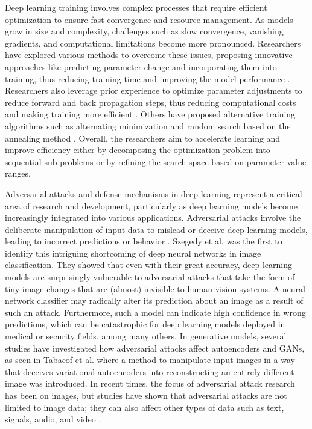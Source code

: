 \documentclass[preprint,12pt]{elsarticle}
\begin{document}
Deep learning training involves complex processes that require efficient optimization to ensure fast convergence and resource management. As models grow in size and complexity, challenges such as slow convergence, vanishing gradients, and computational limitations become more pronounced. Researchers have explored various methods to overcome these issues, proposing innovative approaches like predicting parameter change and incorporating them into training, thus reducing training time and improving the model performance \citep{ying_enhancing_2024}. Researchers also leverage prior experience to optimize parameter adjustments to reduce forward and back propagation steps, thus reducing computational costs and making training more efficient \citep{wang_optimizing_2024}. Others have proposed alternative training algorithms such as alternating minimization \citep{yan_triple-inertial_2025} and random search based on the annealing method \citep{krasnoproshin_random_2024}. Overall, the researchers aim to accelerate learning and improve efficiency either by decomposing the optimization problem into sequential sub-problems or by refining the search space based on parameter value ranges.

Adversarial attacks and defense mechanisms in deep learning represent a critical area of research and development, particularly as deep learning models become increasingly integrated into various applications. Adversarial attacks involve the deliberate manipulation of input data to mislead or deceive deep learning models, leading to incorrect predictions or behavior \citep{adversarial2018}. Szegedy et al. \citep{szegedy2013intriguing} was the first to identify this intriguing shortcoming of deep neural networks in image classification. They showed that even with their great accuracy, deep learning models are surprisingly vulnerable to adversarial attacks that take the form of tiny image changes that are (almost) invisible to human vision systems. A neural network classifier may radically alter its prediction about an image as a result of such an attack. Furthermore, such a model can indicate high confidence in wrong predictions, which can be catastrophic for deep learning models deployed in medical or security fields, among many others. In generative models, several studies have investigated how adversarial attacks affect autoencoders and GANs, as seen in Tabacof et al. \citep{tabacof2016adversarial} where a method to manipulate input images in a way that deceives variational autoencoders into reconstructing an entirely different image was introduced. In recent times, the focus of adversarial attack research has been on images, but studies have shown that adversarial attacks are not limited to image data; they can also affect other types of data such as text, signals, audio, and video \citep{zhang2020adversarial, jiang2019black, esmaeilpour2019robust}.
\end{document}
